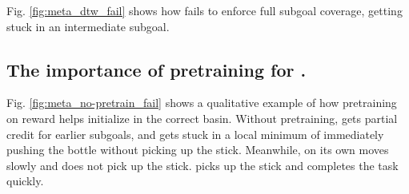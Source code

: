 Fig. \ref{fig:meta_dtw_fail} shows how \dtw{} fails to enforce full subgoal coverage, getting stuck in an intermediate subgoal. 


\subsection{The importance of pretraining for \orca{}.}

Fig. \ref{fig:meta_no-pretrain_fail} shows a qualitative example of how pretraining on \tot{} reward helps initialize \orca{} in the correct basin. Without pretraining, \orcanp{} gets partial credit for earlier subgoals, and gets stuck in a local minimum of immediately pushing the bottle without picking up the stick. Meanwhile, \tot{} on its own moves slowly and does not pick up the stick. \orca{} picks up the stick and completes the task quickly.




% 




% 



% 


